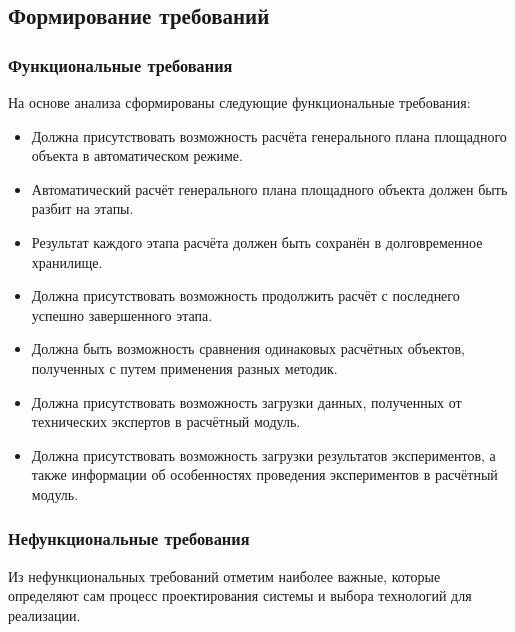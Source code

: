 \subsection{\Large{Формирование требований}}

\subsubsection{\large{Функциональные требования}}

На основе анализа сформированы следующие функциональные требования:
\begin{itemize}
    \item {
        Должна присутствовать возможность расчёта генерального плана площадного объекта в автоматическом режиме.
    }
    \item {
        Автоматический расчёт генерального плана площадного объекта должен быть разбит на этапы.
    }
    \item {
        Результат каждого этапа расчёта должен быть сохранён в долговременное хранилище.
    }
    \item {
        Должна присутствовать возможность продолжить расчёт с последнего успешно завершенного этапа.
    }
    \item {
        Должна быть возможность сравнения одинаковых расчётных объектов, полученных с путем применения разных методик.
    }
    \item {
        Должна присутствовать возможность загрузки данных, полученных от технических экспертов в расчётный модуль.
    }
    \item {
        Должна присутствовать возможность загрузки результатов экспериментов, а также информации об особенностях
        проведения экспериментов в расчётный модуль.
    }
\end{itemize}

\subsubsection{\large{Нефункциональные требования}}

Из нефункциональных требований отметим наиболее важные, которые определяют сам процесс проектирования системы
и выбора технологий для реализации.

